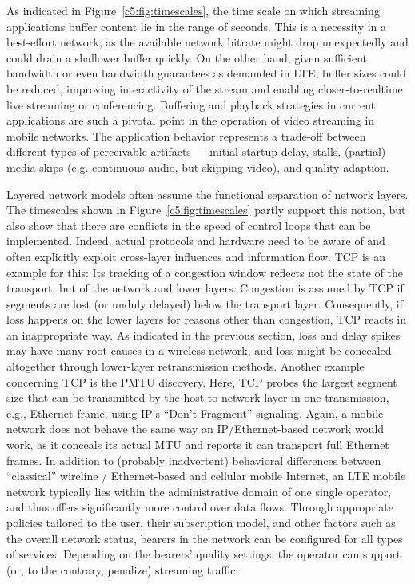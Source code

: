 As indicated in Figure~\ref{c5:fig:timescales}, the time scale on which streaming applications buffer content lie in the range of seconds. This is a necessity in a best-effort network, as the available network bitrate might drop unexpectedly and could drain a shallower buffer quickly. On the other hand, given sufficient bandwidth or even bandwidth guarantees as demanded in \gls{LTE}, buffer sizes could be reduced, improving interactivity of the stream and enabling closer-to-realtime live streaming or conferencing.
Buffering and playback strategies in current applications are such a pivotal point in the operation of video streaming in mobile networks. The application behavior represents a trade-off between different types of perceivable artifacts --- initial startup delay, stalls, (partial) media skips (e.g. continuous audio, but skipping video), and quality adaption.

Layered network models often assume the functional separation of network layers. The timescales shown in Figure~\ref{c5:fig:timescales} partly support this notion, but also show that there are conflicts in the speed of control loops that can be implemented. Indeed, actual protocols and hardware need to be aware of and often explicitly exploit cross-layer influences and information flow.
\gls{TCP} is an example for this: Its tracking of a congestion window reflects not the state of the transport, but of the network and lower layers. Congestion is assumed by \gls{TCP} if segments are lost (or unduly delayed) below the transport layer. Consequently, if loss happens on the lower layers for reasons other than congestion, \gls{TCP} reacts in an inappropriate way. As indicated in the previous section, loss and delay spikes may have many root causes in a wireless network, and loss might be concealed altogether through lower-layer retransmission methods.
Another example concerning \gls{TCP} is the \gls{PMTU} discovery. Here, \gls{TCP} probes the largest segment size that can be transmitted by the host-to-network layer in one transmission, e.g., Ethernet frame, using \gls{IP}'s ``Don't Fragment'' signaling. Again, a mobile network does not behave the same way an \gls{IP}/Ethernet-based network would work, as it conceals its actual \gls{MTU} and reports it can transport full Ethernet frames.
In addition to (probably inadvertent) behavioral differences between ``classical'' wireline / Ethernet-based and cellular mobile Internet, an \gls{LTE} mobile network typically lies within the administrative domain of one single operator, and thus offers significantly more control over data flows. Through appropriate policies tailored to the user, their subscription model, and other factors such as the overall network status, bearers in the network can be configured for all types of services. Depending on the bearers' quality settings, the operator can support (or, to the contrary, penalize) streaming traffic.

